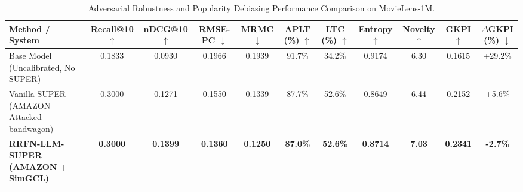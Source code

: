 \begin{table}[t]
\centering
\small
\caption{Adversarial Robustness and Popularity Debiasing Performance Comparison on MovieLens-1M.}
\label{tab:benchmark_results}
\begin{tabular}{lcccccccccc}
\toprule
\textbf{Method / System} & \textbf{Recall@10} $\uparrow$ & \textbf{nDCG@10} $\uparrow$ & \textbf{RMSE-PC} $\downarrow$ & \textbf{MRMC} $\downarrow$ & \textbf{APLT} (\%) $\uparrow$ & \textbf{LTC} (\%) $\uparrow$ & \textbf{Entropy} $\uparrow$ & \textbf{Novelty} $\uparrow$ & \textbf{GKPI} $\uparrow$ & \textbf{$\Delta$GKPI} (\%) $\downarrow$ \\
\midrule
Base Model (Uncalibrated, No SUPER) & 0.1833 & 0.0930 & 0.1966 & 0.1939 & 91.7\% & 34.2\% & 0.9174 & 6.30 & 0.1615 & +29.2\% \\
Vanilla SUPER (AMAZON Attacked bandwagon) & 0.3000 & 0.1271 & 0.1550 & 0.1339 & 87.7\% & 52.6\% & 0.8649 & 6.44 & 0.2152 & +5.6\% \\
\textbf{RRFN-LLM-SUPER (AMAZON + SimGCL)} & \textbf{0.3000} & \textbf{0.1399} & \textbf{0.1360} & \textbf{0.1250} & \textbf{87.0\%} & \textbf{52.6\%} & \textbf{0.8714} & \textbf{7.03} & \textbf{0.2341} & \textbf{-2.7\%} \\
\bottomrule
\end{tabular}
\end{table}